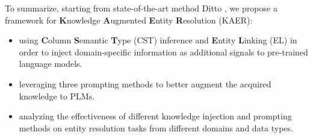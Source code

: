 To summarize, starting from state-of-the-art method Ditto \cite{li_deep_2020}, we propose a framework for  \textbf{K}nowledge \textbf{A}ugmented \textbf{E}ntity \textbf{R}esolution (KAER):
\begin{itemize}
    \item using \textbf{C}olumn \textbf{S}emantic \textbf{T}ype (CST) inference and \textbf{E}ntity \textbf{L}inking (EL) in order to inject domain-specific information as additional signals to pre-trained language models. 
    \item leveraging three prompting methods to better augment the acquired knowledge to PLMs.
    \item analyzing the effectiveness of different knowledge injection and prompting methods on entity resolution tasks from different domains and data types.
\end{itemize}

    
